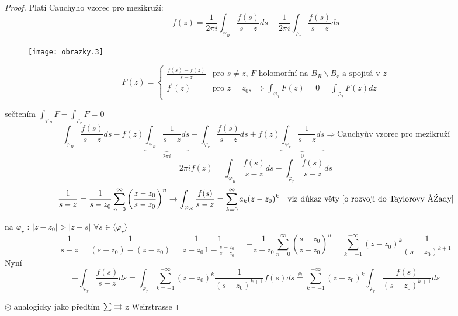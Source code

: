 \begin{proof}
Platí Cauchyho vzorec pro mezikruží:
$$f(z) = \frac{1}{2 \pi i} \int_{\varphi_R} \frac{f(s)}{s-z} ds - \frac{1}{2 \pi i} \int_{\varphi_r} \frac{f(s)}{s-z} ds$$

\begin{figure}[!hp] \begin{center}
\texttt{[image: obrazky.3]}
\end{center} \end{figure}

\begin{equation*}
F(z) = \left\{ \begin{array}{ll}
 \frac{f(s)-f(z)}{s-z} & \textrm{pro $s \neq z$, $F$ holomorfní na $B_R \backslash B_r$ a spojitá v $z$} \\
 f^\prime(z) & \textrm{pro $z=z_0$, $\Rightarrow \int_{\varphi_1} F(z) = 0 = \int_{\varphi_2} F(z) dz$}
  \end{array} \right.
\end{equation*}

sečtením $\int_{\varphi_R} F - \int_{\varphi_r} F = 0$
$$\int_{\varphi_R} \frac{f(s)}{s-z} ds - f(z) \underbrace{\int_{\varphi_R} \frac{1}{s-z} ds}_{2 \pi i} - \int_{\varphi_r} \frac{f(s)}{s-z} ds + f(z) \underbrace{\int_{\varphi_r} \frac{1}{s-z} ds}_{0} \Rightarrow \textrm{Cauchyův vzorec pro mezikruží}$$
$$2 \pi i f(z) = \int_{\varphi_R} \frac{f(s)}{s-z} ds - \int_{\varphi_r} \frac{f(s)}{s-z} ds$$
$$\frac{1}{s-z} = \frac{1}{s-z_0} \sum_{n=0}^\infty \left( \frac{z-z_0}{s-z_0} \right)^n \to \int_{\varphi_R} \frac{f(s)}{s-z} = \sum_{k=0}^\infty a_k (z-z_0)^k \quad \textrm{viz důkaz věty \ref{o rozvoji do Taylorovy řady}}$$

na $\varphi_r$ : $|z-z_0| > |z-s|$ $\forall s \in \langle \varphi_r \rangle$
$$\frac{1}{s-z} = \frac{1}{(s-z_0)-(z-z_0)} = \frac{-1}{z-z_0} \frac{1}{1 - \frac{s-z_0}{z-z_0}} = - \frac{1}{z-z_0} \sum_{n=0}^\infty \left( \frac{s-z_0}{z-z_0} \right)^n = \sum_{k=-1}^{-\infty} (z-z_0)^k \frac{1}{(s-z_0)^{k+1}}$$
Nyní
$$- \int_{\varphi_r} \frac{f(s)}{s-z} ds = \int_{\varphi_r} \sum_{k=-1}^{-\infty} (z-z_0)^k \frac{1}{(s-z_0)^{k+1}} f(s) ds \overset{\circledast}{=} \sum_{k=-1}^{-\infty} (z-z_0)^{k} \int_{\varphi_r} \frac{f(s)}{(s-z_0)^{k+1}} ds$$

$\circledast$ analogicky jako předtím $\sum \rightrightarrows$ z Weirstrasse
\end{proof}
